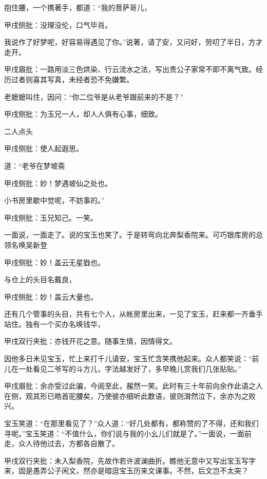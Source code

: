 \begin{parag}
抱住腰，一个携著手，都道：“我的菩萨哥儿，\begin{note}甲戌侧批：没理没伦，口气毕肖。\end{note}我说作了好梦呢，好容易得遇见了你。”说著，请了安，又问好，劳叨了半日，方才走开。\begin{note}甲戌眉批：一路用淡三色烘染、行云流水之法，写出贵公子家常不即不离气致。经历过者则喜其写真，未经者恐不免嫌繁。\end{note}老嬷嬷叫住，因问：“你二位爷是从老爷跟前来的不是？”\begin{note}甲戌侧批：为玉兄一人，却人人俱有心事，细致。\end{note}二人点头\begin{note}甲戌侧批：使人起遐思。\end{note}道：“老爷在梦坡斋\begin{note}甲戌侧批：妙！梦遇坡仙之处也。\end{note}小书房里歇中觉呢，不妨事的。”\begin{note}甲戌侧批：玉兄知己。一笑。\end{note}一面说，一面走了。说的宝玉也笑了。于是转弯向北奔梨香院来。可巧银库房的总领名唤吴新登\begin{note}甲戌侧批：妙！盖云无星戥也。\end{note}与仓上的头目名戴良，\begin{note}甲戌侧批：妙！盖云大量也。\end{note}还有几个管事的头目，共有七个人，从帐房里出来，一见了宝玉，赶来都一齐垂手站住。独有一个买办名唤钱华，\begin{note}甲戌双行夹批：亦钱开花之意。随事生情，因情得文。\end{note}因他多日未见宝玉，忙上来打千儿请安，宝玉忙含笑携他起来。众人都笑说：“前儿在一处看见二爷写的斗方儿，字法越发好了，多早晚儿赏我们几张贴贴。”\begin{note}甲戌眉批：余亦受过此骗，今阅至此，赧然一笑。此时有三十年前向余作此语之人在侧，观其形已皓首驼腰矣，乃使彼亦细听此数语，彼则潸然泣下，余亦为之败兴。\end{note}宝玉笑道：“在那里看见了？”众人道：“好几处都有，都称赞的了不得，还和我们寻呢。”宝玉笑道：“不值什么，你们说与我的小幺儿们就是了。”一面说，一面前走，众人待他过去，方都各自散了。\begin{note}甲戌双行夹批：未入梨香院，先故作若许波澜曲折。瞧他无意中又写出宝玉写字来，固是愚弄公子闲文，然亦是暗逗宝玉历来文课事。不然，后文岂不太突？\end{note}
\end{parag}


